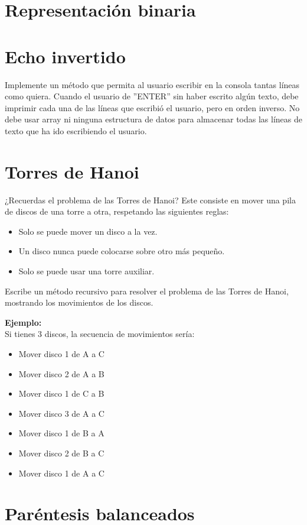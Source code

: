 \section{Representación binaria}


\section{Echo invertido}
Implemente un método que permita al usuario escribir en la consola tantas líneas como quiera. Cuando el usuario de ''ENTER'' sin haber escrito algún texto, debe imprimir cada una de las líneas que escribió el usuario, pero en orden inverso. No debe usar array ni ninguna estructura de datos para almacenar todas las líneas de texto que ha ido escribiendo el usuario.

\section{Torres de Hanoi}
¿Recuerdas el problema de las Torres de Hanoi? Este consiste en mover una pila de discos de una torre a otra, respetando las siguientes reglas:
\begin{itemize}
    \item Solo se puede mover un disco a la vez.
    \item Un disco nunca puede colocarse sobre otro más pequeño.
    \item Solo se puede usar una torre auxiliar.
\end{itemize}

Escribe un método recursivo para resolver el problema de las Torres de Hanoi, mostrando los movimientos de los discos.

\textbf{Ejemplo:}\\
Si tienes 3 discos, la secuencia de movimientos sería:
\begin{itemize}
    \item Mover disco 1 de A a C
    \item Mover disco 2 de A a B
    \item Mover disco 1 de C a B
    \item Mover disco 3 de A a C
    \item Mover disco 1 de B a A
    \item Mover disco 2 de B a C
    \item Mover disco 1 de A a C
\end{itemize}

\section{Paréntesis balanceados}

